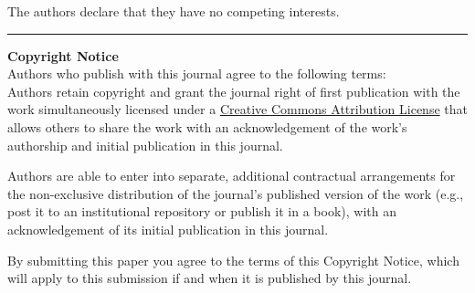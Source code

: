 The authors declare that they have no competing interests.




\rule{\textwidth}{1pt}

{ \bf Copyright Notice} \\
Authors who publish with this journal agree to the following terms: \\

Authors retain copyright and grant the journal right of first publication with
the work simultaneously licensed under a
\href{http://creativecommons.org/licenses/by/3.0/}{Creative Commons Attribution
License} that allows others to share the work with an acknowledgement of the
work's authorship and initial publication in this journal.

Authors are able to enter into separate, additional contractual arrangements
for the non-exclusive distribution of the journal's published version of the
work (e.g., post it to an institutional repository or publish it in a book),
with an acknowledgement of its initial publication in this journal.

By submitting this paper you agree to the terms of this Copyright Notice, which
will apply to this submission if and when it is published by this journal.

